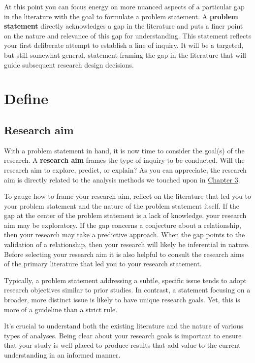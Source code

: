 \documentclass[
  letterpaper,
]{latex/krantz}
\theoremstyle{definition}
\theoremstyle{remark}
\begin{document}
At this point you can focus energy on more nuanced aspects of a
particular gap in the literature with the goal to formulate a problem
statement. A \textbf{problem statement} directly acknowledges a gap in
the literature and puts a finer point on the nature and relevance of
this gap for understanding. This statement reflects your first
deliberate attempt to establish a line of inquiry. It will be a
targeted, but still somewhat general, statement framing the gap in the
literature that will guide subsequent research design decisions.

\section{Define}\label{sec-research-define}

\subsection{Research aim}\label{sec-research-aim}

With a problem statement in hand, it is now time to consider the goal(s)
of the research. A \textbf{research aim} frames the type of inquiry to
be conducted. Will the research aim to explore, predict, or explain? As
you can appreciate, the research aim is directly related to the analysis
methods we touched upon in \hyperref[sec-approaching-analysis]{Chapter
3}.

To gauge how to frame your research aim, reflect on the literature that
led you to your problem statement and the nature of the problem
statement itself. If the gap at the center of the problem statement is a
lack of knowledge, your research aim may be exploratory. If the gap
concerns a conjecture about a relationship, then your research may take
a predictive approach. When the gap points to the validation of a
relationship, then your research will likely be inferential in nature.
Before selecting your research aim it is also helpful to consult the
research aims of the primary literature that led you to your research
statement.

Typically, a problem statement addressing a subtle, specific issue tends
to adopt research objectives similar to prior studies. In contrast, a
statement focusing on a broader, more distinct issue is likely to have
unique research goals. Yet, this is more of a guideline than a strict
rule.

It's crucial to understand both the existing literature and the nature
of various types of analyses. Being clear about your research goals is
important to ensure that your study is well-placed to produce results
that add value to the current understanding in an informed manner.
\end{document}
